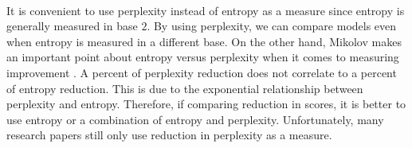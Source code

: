 \paragraph{}
It is convenient to use perplexity instead of entropy as a measure since entropy is generally measured in base $2$. By using perplexity, we can compare models even when entropy is measured in a different base. On the other hand, Mikolov makes an important point about entropy versus perplexity when it comes to measuring improvement \cite{Mikolov2012}. A percent of perplexity reduction does not correlate to a percent of entropy reduction. This is due to the exponential relationship between perplexity and entropy. Therefore, if comparing reduction in scores, it is better to use entropy or a combination of entropy and perplexity. Unfortunately, many research papers still only use reduction in perplexity as a measure.
